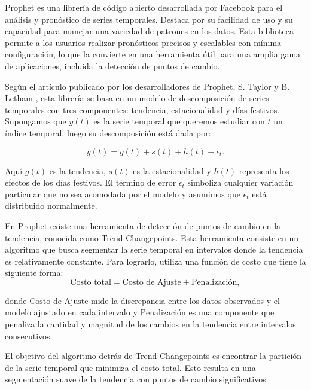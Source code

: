\documentclass{article}[14pts]
\begin{document}
    Prophet es una librería de código abierto desarrollada por Facebook para el análisis y pronóstico de series temporales. Destaca por su facilidad de uso y su capacidad para manejar una variedad de patrones en los datos. Esta biblioteca permite a los usuarios realizar pronósticos precisos y escalables con mínima configuración, lo que la convierte en una herramienta útil para una amplia gama de aplicaciones, incluida la detección de puntos de cambio. 

    Según el artículo publicado por los desarrolladores de Prophet, S. Taylor y B. Letham \cite{taylor2017prophet}, esta librería se basa en un modelo de descomposición de series temporales con tres componentes: tendencia, estacionalidad y días festivos. Supongamos que $y(t)$ es la serie temporal que queremos estudiar con $t$ un índice temporal, luego su descomposición está dada por:
  
     \begin{equation*}
       y(t)= g(t) + s(t) + h(t) + \epsilon_t.
     \end{equation*}

    Aquí $g(t)$ es la tendencia, $s(t)$ es la estacionalidad y $h(t)$ representa los efectos de los días festivos. El término de error $\epsilon_t$ simboliza cualquier variación particular que no sea acomodada por el modelo y asumimos que $\epsilon_t$ está distribuido normalmente. 

    En Prophet existe una herramienta de detección de puntos de cambio en la tendencia, conocida como Trend Changepoints. Esta herramienta consiste en un algoritmo que busca segmentar la serie temporal en intervalos donde la tendencia es relativamente constante. Para lograrlo, utiliza una función de costo que tiene la siguiente forma:
     \begin{equation*}
       \text{Costo total} = \text{Costo de Ajuste} + \text{Penalización},
     \end{equation*}

    donde $\text{Costo de Ajuste}$ mide la discrepancia entre los datos observados y el modelo ajustado en cada intervalo y $\text{Penalización}$ es una componente que penaliza la cantidad y magnitud de los cambios en la tendencia entre intervalos consecutivos.

    El objetivo del algoritmo detrás de Trend Changepoints es encontrar la partición de la serie temporal que minimiza el costo total. Esto resulta en una segmentación suave de la tendencia con puntos de cambio significativos. 
\end{document}
